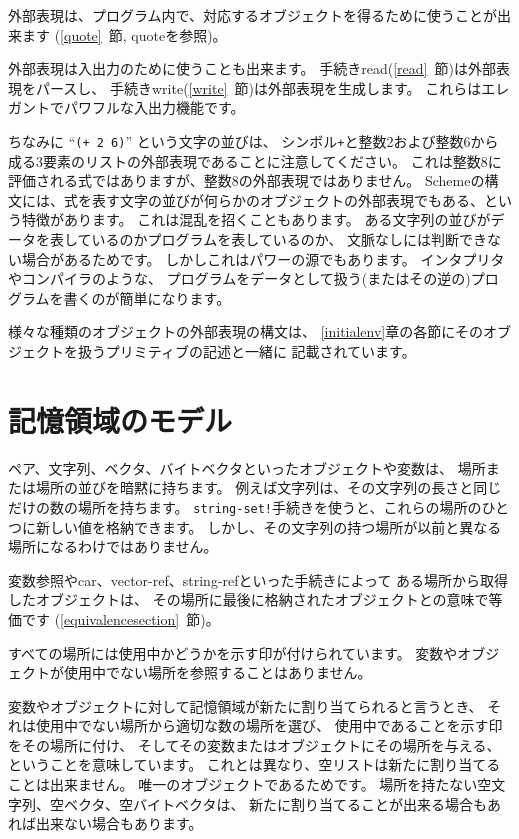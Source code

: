外部表現は、プログラム内で、対応するオブジェクトを得るために使うことが出来ます
(\ref{quote}~節, {\cf quote}を参照)。

外部表現は入出力のために使うことも出来ます。
手続き{\cf read}(\ref{read}~節)は外部表現をパースし、
手続き{\cf write}(\ref{write}~節)は外部表現を生成します。
これらはエレガントでパワフルな入出力機能です。

ちなみに ``{\tt(+ 2 6)}'' という文字の並びは、
シンボル{\tt +}と整数2および整数6から成る3要素のリストの外部表現であることに注意してください。
これは整数8に評価される式ではありますが、整数8の外部表現ではありません。
Schemeの構文には、式を表す文字の並びが何らかのオブジェクトの外部表現でもある、という特徴があります。
これは混乱を招くこともあります。
ある文字列の並びがデータを表しているのかプログラムを表しているのか、
文脈なしには判断できない場合があるためです。
しかしこれはパワーの源でもあります。
インタプリタやコンパイラのような、
プログラムをデータとして扱う(またはその逆の)プログラムを書くのが簡単になります。

様々な種類のオブジェクトの外部表現の構文は、
\ref{initialenv}章の各節にそのオブジェクトを扱うプリミティブの記述と一緒に
記載されています。

\section{記憶領域のモデル}
\label{storagemodel}

ペア、文字列、ベクタ、バイトベクタといったオブジェクトや変数は、
場所または場所の並びを暗黙に持ちます。
例えば文字列は、その文字列の長さと同じだけの数の場所を持ちます。
{\tt string-set!}手続きを使うと、これらの場所のひとつに新しい値を格納できます。
しかし、その文字列の持つ場所が以前と異なる場所になるわけではありません。

変数参照や{\cf car}、{\cf vector-ref}、{\cf string-ref}といった手続きによって
ある場所から取得したオブジェクトは、
その場所に最後に格納されたオブジェクトとの意味で等価です
(\ref{equivalencesection}~節)。

すべての場所には使用中かどうかを示す印が付けられています。
変数やオブジェクトが使用中でない場所を参照することはありません。

変数やオブジェクトに対して記憶領域が新たに割り当てられると言うとき、
それは使用中でない場所から適切な数の場所を選び、
使用中であることを示す印をその場所に付け、
そしてその変数またはオブジェクトにその場所を与える、
ということを意味しています。
これとは異なり、空リストは新たに割り当てることは出来ません。
唯一のオブジェクトであるためです。
場所を持たない空文字列、空ベクタ、空バイトベクタは、
新たに割り当てることが出来る場合もあれば出来ない場合もあります。

